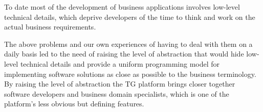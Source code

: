   To date most of the development of business applications involves low-level technical details, which deprive developers of the time to think and work on the actual business requirements.
  
  The above problems and our own experiences of having to deal with them on a daily basis led to the need of raising the level of abstraction that would hide low-level technical details and provide a uniform programming model for implementing software solutions as close as possible to the business terminology.
  By raising the level of abstraction the TG platform brings closer together software developers and business domain specialists, which is one of the platform's less obvious but defining features.
